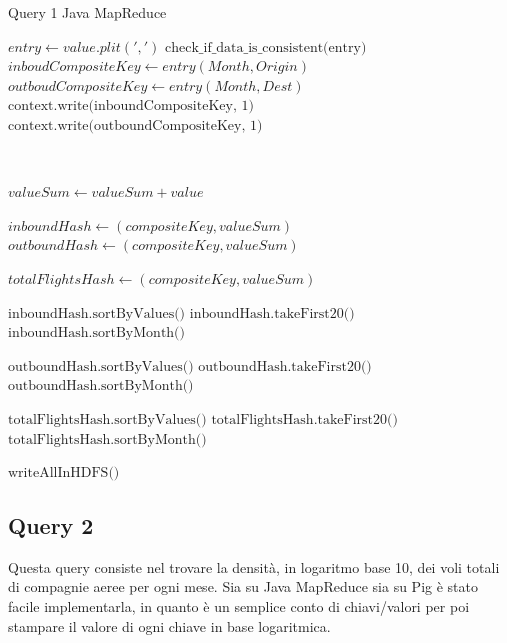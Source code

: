 \documentclass[11pt]{article} %
\begin{document}
\begin{algorithm}
\caption{Query 1 Java MapReduce}\label{euclid}
\begin{algorithmic}[0]


\State $entry \gets value.plit(',')$
\State $\text{check\_if\_data\_is\_consistent(entry)}$
\State $inboudCompositeKey \gets entry(Month, Origin)$
\State $outboudCompositeKey \gets entry(Month, Dest)$
\State $\text{context.write(inboundCompositeKey, 1)}$
\State $\text{context.write(outboundCompositeKey, 1)}$

\EndProcedure

~


	\State $valueSum \gets valueSum + value$
\EndFor

	\State $inboundHash \gets (compositeKey, valueSum)$
\Else
	\State $outboundHash \gets (compositeKey, valueSum)$
\EndIf

\State $totalFlightsHash \gets (compositeKey, valueSum)$

\EndProcedure 


\State $\text{inboundHash.sortByValues()}$
\State $\text{inboundHash.takeFirst20()}$
\State $\text{inboundHash.sortByMonth()}$

\State $\text{outboundHash.sortByValues()}$
\State $\text{outboundHash.takeFirst20()}$
\State $\text{outboundHash.sortByMonth()}$

\State $\text{totalFlightsHash.sortByValues()}$
\State $\text{totalFlightsHash.takeFirst20()}$
\State $\text{totalFlightsHash.sortByMonth()}$

\State $\text{writeAllInHDFS()}$

\EndProcedure


\end{algorithmic}
\end{algorithm}

\subsection{Query 2}

Questa query consiste nel trovare la densità, in logaritmo base 10, dei voli totali di compagnie aeree per ogni mese. Sia su Java MapReduce sia su Pig è stato facile implementarla, in quanto è un semplice conto di chiavi/valori per poi stampare il valore di ogni chiave in base logaritmica.
\end{document}
